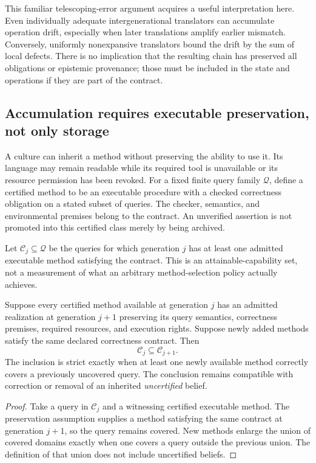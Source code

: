This familiar telescoping-error argument acquires a useful interpretation here. Even individually adequate intergenerational translators can accumulate operation drift, especially when later translations amplify earlier mismatch. Conversely, uniformly nonexpansive translators bound the drift by the sum of local defects. There is no implication that the resulting chain has preserved all obligations or epistemic provenance; those must be included in the state and operations if they are part of the contract.


\subsection{Accumulation requires executable preservation, not only storage}
A culture can inherit a method without preserving the ability to use it. Its language may remain readable while its required tool is unavailable or its resource permission has been revoked. For a fixed finite query family $\mathcal Q$, define a certified method to be an executable procedure with a checked correctness obligation on a stated subset of queries. The checker, semantics, and environmental premises belong to the contract. An unverified assertion is not promoted into this certified class merely by being archived.

Let $\mathcal C_j\subseteq\mathcal Q$ be the queries for which generation $j$ has at least one admitted executable method satisfying the contract. This is an attainable-capability set, not a measurement of what an arbitrary method-selection policy actually achieves.

\begin{MSproposition}\label{MS:prop:culturegrowth}
Suppose every certified method available at generation $j$ has an admitted realization at generation $j+1$ preserving its query semantics, correctness premises, required resources, and execution rights. Suppose newly added methods satisfy the same declared correctness contract. Then
\[
\mathcal C_j\subseteq\mathcal C_{j+1}.
\]
The inclusion is strict exactly when at least one newly available method correctly covers a previously uncovered query. The conclusion remains compatible with correction or removal of an inherited \emph{uncertified} belief.
\end{MSproposition}
\begin{proof}
Take a query in $\mathcal C_j$ and a witnessing certified executable method. The preservation assumption supplies a method satisfying the same contract at generation $j+1$, so the query remains covered. New methods enlarge the union of covered domains exactly when one covers a query outside the previous union. The definition of that union does not include uncertified beliefs.
\end{proof}

